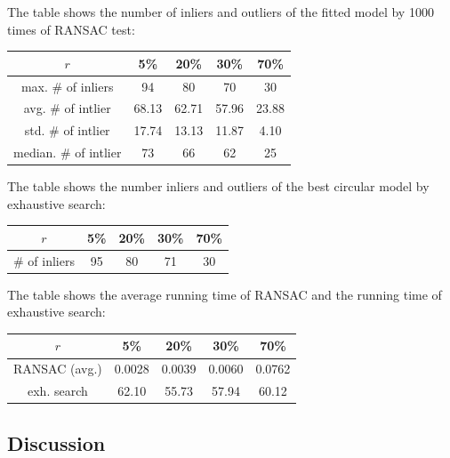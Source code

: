 \documentclass[paper=a4, fontsize=11pt]{scrartcl} %
\numberwithin{equation}{section} %
\numberwithin{figure}{section} %
\numberwithin{table}{section} %
\begin{document}
The table shows the number of inliers and outliers of the fitted model by 1000 times of RANSAC test:

\begin{center}
    \begin{tabular}{ | c | c | c | c | c |}
    \hline
    $r$			&	5\%	&	20\%	&	30\%	&	70\% \\ \hline
    max. \# of inliers		&	94 		& 	80 		& 	70	& 	30 	\\ \hline
    avg. \# of intlier 		& 	68.13	& 	62.71 	& 	57.96	& 	23.88 \\ \hline
    std. \# of intlier 		& 	17.74	& 	13.13 	& 	11.87	& 	4.10 \\ \hline
    median. \# of intlier 	& 	73		& 	66 		& 	62		& 	25 \\ \hline
    \end{tabular}
\end{center} 

The table shows the number inliers and outliers of the best circular model by exhaustive search:

\begin{center}
    \begin{tabular}{ | c | c | c | c | c |}
    \hline
    $r$			&	5\%	&	20\%	&	30\%	&	70\% \\ \hline
    \# of inliers		&	95 	& 	80 	& 	71	& 	30 	\\ \hline
    \end{tabular}
\end{center} 

The table shows the average running time of RANSAC and the running time of exhaustive search:

\begin{center}
    \begin{tabular}{ | c | c | c | c | c |}
    \hline
    $r$			&	5\%	&	20\%	&	30\%	&	70\% \\ \hline
    RANSAC (avg.)	&	0.0028	&	0.0039	&	0.0060	&     0.0762	\\ \hline
    exh. search		&	62.10 	& 	55.73 	& 	57.94	& 	60.12 	\\ \hline
    \end{tabular}
\end{center} 

\subsection{Discussion}
\end{document}
